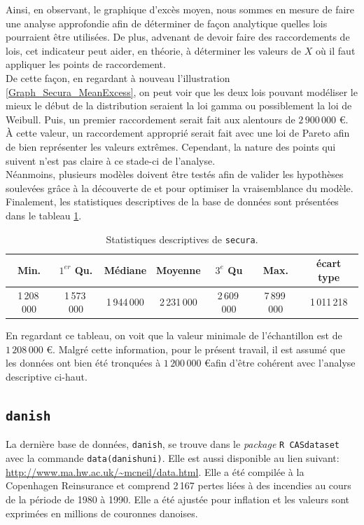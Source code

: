 		Ainsi, en observant, le graphique d'excès moyen, nous sommes en mesure de faire une analyse approfondie afin de déterminer de façon analytique quelles lois pourraient être utilisées. De plus,  advenant de devoir faire des raccordements de lois, cet indicateur peut aider, en théorie, à déterminer les valeurs de $X$ où il faut appliquer les points de raccordement.\\
		
		De cette façon, en regardant à nouveau l'illustration \ref{Graph_Secura_MeanExcess}, on peut voir que les deux lois pouvant modéliser le mieux le début de la distribution seraient la loi gamma ou possiblement la loi de Weibull. Puis, un premier raccordement serait fait aux alentours de $2\,900\,000$ \euro. À cette valeur, un raccordement approprié serait fait avec une loi de Pareto afin de bien représenter les valeurs extrêmes. Cependant, la nature des points qui suivent n'est pas claire à ce stade-ci de l'analyse.\\
		
		Néanmoins, plusieurs modèles doivent être testés afin de valider les hypothèses soulevées grâce à la découverte de \cite{Embrechts1994} et pour optimiser la vraisemblance du modèle.\\
						
		Finalement, les statistiques descriptives de la base de données sont présentées dans le tableau \ref{Stats_Secura}.
				
		\begin{table}[H]
			\begin{center}
				\begin{tabular}{ccccccc}
					Min.& $1^{er}$ Qu.	&	Médiane	&	Moyenne	&	$3^e$ Qu	&	Max.	&	écart type \\
					\hline
					1\,208\,000 & 1\,573\,000 & 1\,944\,000 & 2\,231\,000 & 2\,609\,000 & 7\,899\,000 	&	1\,011\,218
				\end{tabular}
				\renewcommand{\tablename}{Tableau}
				\caption{Statistiques descriptives de \texttt{secura}.}\label{Stats_Secura}
			\end{center}
		\end{table}
	
	En regardant ce tableau, on voit que la valeur minimale de l'échantillon est de $1\,208\,000$ \euro. Malgré cette information, pour le présent travail, il est assumé que les données ont bien été tronquées à $1\,200\,000$ \euro\;afin d'être cohérent avec l'analyse descriptive ci-haut.
	
	\subsection{\texttt{danish}}
		La dernière base de données, \texttt{danish}, se trouve dans le \textit{package} \texttt{R CASdataset} avec la commande \texttt{data(danishuni)}. Elle est aussi disponible au lien suivant: \url{http://www.ma.hw.ac.uk/~mcneil/data.html}. Elle a été compilée à la Copenhagen Reinsurance et comprend 2\,167 pertes liées à des incendies au cours de la période de 1980 à 1990. Elle a été ajustée pour inflation et les valeurs sont exprimées en millions de couronnes danoises.\\
		
